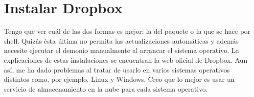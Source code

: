 \section{Instalar Dropbox}\label{sec:dropbox}
Tengo que ver cuál de las dos formas es mejor: la del paquete  o la que se hace por shell. Quizás
ésta última no permita las actualizaciones automáticas y además necesite ejecutar el demonio manualmente al
arrancar el sistema operativo. La explicaciones de estas instalaciones se encuentran la web oficial de
Dropbox. Aun así, me ha dado problemas al tratar de usarlo en varios sistemas operativos distintos como, por
ejemplo, Linux y Windows. Creo que lo mejor es usar un servicio de almacenamiento en la nube para cada sistema
operativo.
